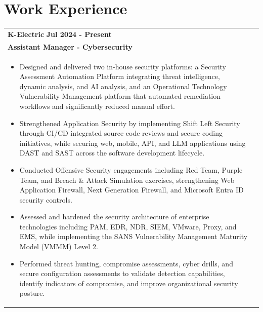 \documentclass[a4paper,8pt]{article}
\begin{document}
\section{\textbf{Work Experience}}
\begin{tabularx}{\linewidth}{ @{}l r@{} }
    \textbf{K-Electric} \hfill \textbf{Jul 2024 - Present} \\[4pt]
    \textbf{Assistant Manager - Cybersecurity}\\[4pt]
    \begin{minipage}[t]{\linewidth}
        \begin{itemize}[nosep,after=\strut, leftmargin=1em, itemsep=2pt]
            \item Designed and delivered two in-house security platforms: a Security Assessment Automation Platform integrating threat intelligence, dynamic analysis, and AI analysis, and an Operational Technology Vulnerability Management platform that automated remediation workflows and significantly reduced manual effort.
            \item Strengthened Application Security by implementing Shift Left Security through CI/CD integrated source code reviews and secure coding initiatives, while securing web, mobile, API, and LLM applications using DAST and SAST across the software development lifecycle.
            \item Conducted Offensive Security engagements including Red Team, Purple Team, and Breach \& Attack Simulation    exercises, strengthening Web Application Firewall, Next Generation Firewall, and Microsoft Entra ID security controls.
            \item Assessed and hardened the security architecture of enterprise technologies including PAM, EDR, NDR, SIEM, VMware, Proxy, and EMS, while implementing the SANS Vulnerability Management Maturity Model (VMMM) Level 2.
            \item Performed threat hunting, compromise assessments, cyber drills, and secure configuration assessments to validate detection capabilities, identify indicators of compromise, and improve organizational security posture.
    \end{itemize}
\end{minipage}
\end{tabularx}
\end{document}
